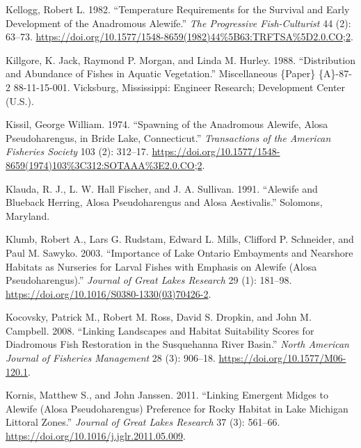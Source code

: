 \documentclass[
]{book}
\newlength{\cslhangindent}
\newlength{\cslentryspacingunit} %
\newenvironment{CSLReferences}[2] %
 {%
  \setlength{\parindent}{0pt}
  \ifodd #1
  \let\oldpar\par
  \def\par{\hangindent=\cslhangindent\oldpar}
  \fi
  \setlength{\parskip}{#2\cslentryspacingunit}
 }%
 {}
\begin{document}
\begin{CSLReferences}{1}{0}
\leavevmode{}%
Kellogg, Robert L. 1982. {``Temperature {Requirements} for the {Survival} and {Early} {Development} of the {Anadromous} {Alewife}.''} \emph{The Progressive Fish-Culturist} 44 (2): 63--73. \url{https://doi.org/10.1577/1548-8659(1982)44\%5B63:TRFTSA\%5D2.0.CO;2}.

\leavevmode{}%
Killgore, K. Jack, Raymond P. Morgan, and Linda M. Hurley. 1988. {``Distribution and {Abundance} of {Fishes} in {Aquatic} {Vegetation}.''} Miscellaneous \{Paper\} \{A\}-87-2 88-11-15-001. Vicksburg, Mississippi: Engineer Research; Development Center (U.S.).

\leavevmode{}%
Kissil, George William. 1974. {``Spawning of the {Anadromous} {Alewife}, {Alosa} Pseudoharengus, in {Bride} {Lake}, {Connecticut}.''} \emph{Transactions of the American Fisheries Society} 103 (2): 312--17. \url{https://doi.org/10.1577/1548-8659(1974)103\%3C312:SOTAAA\%3E2.0.CO;2}.

\leavevmode{}%
Klauda, R. J., L. W. Hall Fischer, and J. A. Sullivan. 1991. {``Alewife and {Blueback} {Herring}, {Alosa} Pseudoharengus and {Alosa} Aestivalis.''} Solomons, Maryland.

\leavevmode{}%
Klumb, Robert A., Lars G. Rudstam, Edward L. Mills, Clifford P. Schneider, and Paul M. Sawyko. 2003. {``Importance of {Lake} {Ontario} {Embayments} and {Nearshore} {Habitats} as {Nurseries} for {Larval} {Fishes} with {Emphasis} on {Alewife} ({Alosa} Pseudoharengus).''} \emph{Journal of Great Lakes Research} 29 (1): 181--98. \url{https://doi.org/10.1016/S0380-1330(03)70426-2}.

\leavevmode{}%
Kocovsky, Patrick M., Robert M. Ross, David S. Dropkin, and John M. Campbell. 2008. {``Linking {Landscapes} and {Habitat} {Suitability} {Scores} for {Diadromous} {Fish} {Restoration} in the {Susquehanna} {River} {Basin}.''} \emph{North American Journal of Fisheries Management} 28 (3): 906--18. \url{https://doi.org/10.1577/M06-120.1}.

\leavevmode{}%
Kornis, Matthew S., and John Janssen. 2011. {``Linking Emergent Midges to Alewife ({Alosa} Pseudoharengus) Preference for Rocky Habitat in {Lake} {Michigan} Littoral Zones.''} \emph{Journal of Great Lakes Research} 37 (3): 561--66. \url{https://doi.org/10.1016/j.jglr.2011.05.009}.


\end{CSLReferences}
\end{document}
